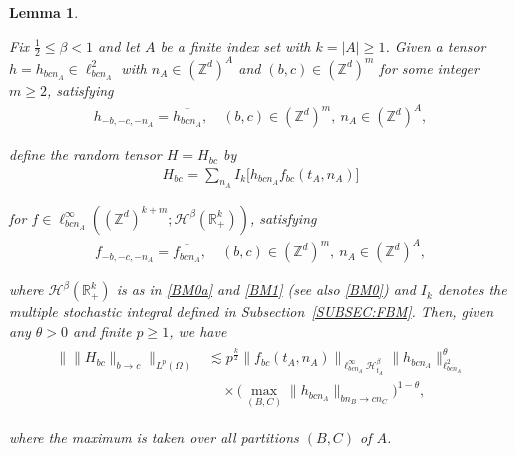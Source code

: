 \documentclass[letterpaper, 11pt,  reqno]{amsart}
\newtheorem{lemma}[theorem]{Lemma}
\newcommand{\1}{\hspace{0.5mm}\textup{I}\hspace{0.5mm}}
\newcommand{\noi}{\noindent}
\newcommand{\Z}{\mathbb{Z}}
\newcommand{\R}{\mathbb{R}}
\newcommand{\be}{\beta}
\newcommand{\g}{\gamma}
\newcommand{\cj}{\overline}
\newcommand{\ta}{\theta}
\renewcommand{\l}{\ell}
\newcommand{\les}{\lesssim}
\newcommand{\Hs}{\mathscr{H}}
\newcommand{\Om}{\Omega}
\numberwithin{equation}{section}
\numberwithin{theorem}{section}
\begin{document}
\begin{lemma}
\label{LEM:RT}

Fix $\frac 12 \le \be < 1$
and let $A$ be a finite index set with $k = |A| \ge 1$. 
Given a  tensor  $h=h_{bc n_A} \in \l^2_{bcn_A}$ 
with  $n_A \in (\Z^d)^{A}$ and $(b,c) \in (\Z^d)^{m}$ for some integer $m\ge2$, 
satisfying
\begin{align}
h_{-b, -c, -n_A} = \cj{h_{bc n_A}}, 
\quad 
(b,c) \in (\Z^d)^{m}, \ 
n_A \in (\Z^d)^{A}, 
\label{BM3}
\end{align}

\noi
 define the random tensor $H = H_{bc}$  by
\begin{align*}
H_{bc} =   \sum_{n_A} I_k \big[ h_{bcn_A} f_{bc} (t_A, n_A) \big]
\end{align*}

\noi
for $f\in \l^\infty_{bc n_A}( (\Z^d)^{k+m} ; \Hs^\be(\R_+^{k})  )$, satisfying
\begin{align}
f_{-b, -c, -n_A} = \cj{f_{bc n_A}}, 
\quad 
(b,c) \in (\Z^d)^{m}, \ 
n_A \in (\Z^d)^{A}, 
\label{BM4}
\end{align}

\noi
where 
$\Hs^\be(\R_+^{k})$ 
is as in  \eqref{BM0a} and \eqref{BM1}
\textup{(}see also \eqref{BM0}\textup{)}
and 
$I_k$ denotes the multiple stochastic integral 
defined in Subsection~\ref{SUBSEC:FBM}.
Then, given any $\ta > 0$
and finite $p \ge1$, we have
\noi
\begin{align}
\begin{split}
\big\| \| H_{bc} \|_{b \to c} \big\|_{L^p(\Om)}
&
\les p^\frac k2
\|f_{bc}(t_A,n_A)\|_{\l^\infty_{bc n_A}\Hs^\be_{t_A}}
\| h_{bcn_A} \|_{\l^2_{bcn_A}}^{\ta}\\
 &
 \quad \times \Big( \max_{(B,C)} \|    h_{bcn_A} \|_{b n_B \to c n_C} \Big)^{1 - \ta} , 
\end{split}
\label{BM5}
\end{align}




\noi
where the maximum is taken over  all partitions $(B,C)$ of $A$.



\end{lemma}
\end{document}

